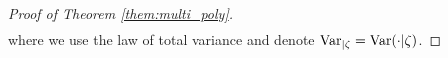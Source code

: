 \begin{proof}[Proof of Theorem \ref{them:multi_poly}]
\begin{align*}
\end{align*}
where we use the law of total variance and denote ${\rm Var}_{|\zeta} = {\rm Var}(\cdot |\zeta)$.


\end{proof}
